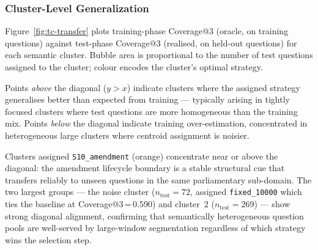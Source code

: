 
\subsubsection{Cluster-Level Generalization}
\label{sec:tc-cluster-transfer}

Figure~\ref{fig:tc-transfer} plots training-phase Coverage@3 (oracle, on training
questions) against test-phase Coverage@3 (realised, on held-out questions) for
each semantic cluster.
Bubble area is proportional to the number of test questions assigned to the cluster;
colour encodes the cluster's optimal strategy.

Points \emph{above} the diagonal ($y > x$) indicate clusters where the assigned
strategy generalises better than expected from training — typically arising in
tightly focused clusters where test questions are more homogeneous than the
training mix.
Points \emph{below} the diagonal indicate training over-estimation, concentrated
in heterogeneous large clusters where centroid assignment is noisier.

Clusters assigned \texttt{S10\_amendment} (orange) concentrate near or above the
diagonal: the amendment lifecycle boundary is a stable structural cue that transfers
reliably to unseen questions in the same parliamentary sub-domain.
The two largest groups — the noise cluster ($n_{\text{test}}{=}72$, assigned
\texttt{fixed\_10000} which ties the baseline at Coverage@3\,=\,0.590) and
cluster~2 ($n_{\text{test}}{=}269$) — show strong diagonal alignment,
confirming that semantically heterogeneous question pools are well-served by
large-window segmentation regardless of which strategy wins the selection step.


